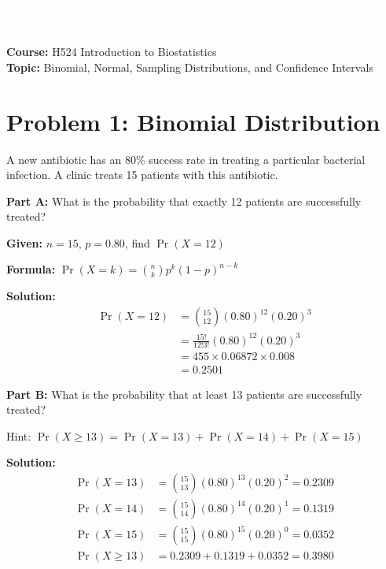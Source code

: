 \documentclass[11pt]{article}
\title{}
\author{}
\date{}
\begin{document}
\begin{tcolorbox}[colback=osaorange,colframe=black,boxrule=2pt,arc=0pt,left=6pt,right=6pt,top=10pt,bottom=10pt]
\centering
\textcolor{white}{\textbf{\Large Week 3 In-Class Worksheet - ANSWER KEY}}\\
\textcolor{white}{\textbf{\large Probability Distributions and Sampling Distributions}}
\end{tcolorbox}

\vspace{8pt}

\noindent\textbf{Course:} H524 Introduction to Biostatistics\\
\textbf{Topic:} Binomial, Normal, Sampling Distributions, and Confidence Intervals

\vspace{12pt}

\section{Problem 1: Binomial Distribution}

A new antibiotic has an 80\% success rate in treating a particular bacterial infection. A clinic treats 15 patients with this antibiotic.

\textbf{Part A:} What is the probability that exactly 12 patients are successfully treated?

\textbf{Given:} $n = 15$, $p = 0.80$, find $\Pr(X = 12)$

\textbf{Formula:} $\Pr(X = k) = \binom{n}{k} p^k (1-p)^{n-k}$

\textcolor{correctgreen}{\textbf{Solution:}}
\begin{align*}
\Pr(X = 12) &= \binom{15}{12} (0.80)^{12} (0.20)^{3}\\
&= \frac{15!}{12!3!} (0.80)^{12} (0.20)^{3}\\
&= 455 \times 0.06872 \times 0.008\\
&= \mathbf{0.2501}
\end{align*}

\vspace{0.5cm}

\textbf{Part B:} What is the probability that at least 13 patients are successfully treated?

Hint: $\Pr(X \geq 13) = \Pr(X=13) + \Pr(X=14) + \Pr(X=15)$

\textcolor{correctgreen}{\textbf{Solution:}}
\begin{align*}
\Pr(X=13) &= \binom{15}{13}(0.80)^{13}(0.20)^{2} = 0.2309\\
\Pr(X=14) &= \binom{15}{14}(0.80)^{14}(0.20)^{1} = 0.1319\\
\Pr(X=15) &= \binom{15}{15}(0.80)^{15}(0.20)^{0} = 0.0352\\
\Pr(X \geq 13) &= 0.2309 + 0.1319 + 0.0352 = \mathbf{0.3980}
\end{align*}
\end{document}
